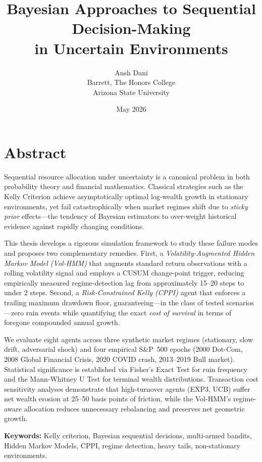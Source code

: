 \documentclass[12pt,oneside]{book}
\title{Bayesian Approaches to Sequential Decision-Making \\ in Uncertain Environments}
\author{Ansh Dani \\ Barrett, The Honors College \\ Arizona State University}
\date{May 2026}
\theoremstyle{plain}
\theoremstyle{definition}
\begin{document}
\maketitle

\chapter*{Abstract}

Sequential resource allocation under uncertainty is a canonical problem in both
probability theory and financial mathematics. Classical strategies such as the
Kelly Criterion achieve asymptotically optimal log-wealth growth in stationary
environments, yet fail catastrophically when market regimes shift due to
\emph{sticky prior} effects---the tendency of Bayesian estimators to over-weight
historical evidence against rapidly changing conditions.

This thesis develops a rigorous simulation framework to study these failure modes
and proposes two complementary remedies. First, a \emph{Volatility-Augmented
Hidden Markov Model (Vol-HMM)} that augments standard return observations with a
rolling volatility signal and employs a CUSUM change-point trigger, reducing
empirically measured regime-detection lag from approximately 15--20 steps to
under 2 steps. Second, a \emph{Risk-Constrained Kelly (CPPI)} agent that
enforces a trailing maximum drawdown floor, guaranteeing---in the class of tested
scenarios---zero ruin events while quantifying the exact \emph{cost of survival}
in terms of foregone compounded annual growth.

We evaluate eight agents across three synthetic market regimes (stationary, slow
drift, adversarial shock) and four empirical S\&P~500 epochs (2000 Dot-Com, 2008
Global Financial Crisis, 2020 COVID crash, 2013--2019 Bull market). Statistical
significance is established via Fisher's Exact Test for ruin frequency and the
Mann-Whitney U Test for terminal wealth distributions. Transaction cost
sensitivity analyses demonstrate that high-turnover agents (EXP3, UCB) suffer
net wealth erosion at 25--50 basis points of friction, while the Vol-HMM's
regime-aware allocation reduces unnecessary rebalancing and preserves net
geometric growth.

\bigskip
\noindent\textbf{Keywords:} Kelly criterion, Bayesian sequential decisions,
multi-armed bandits, Hidden Markov Models, CPPI, regime detection, heavy tails,
non-stationary environments.
\end{document}

